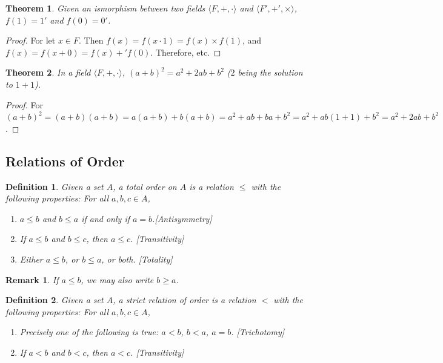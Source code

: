 \documentclass[oneside]{book}
\theoremstyle{mystyle}
\newtheorem{theorem}{Theorem}[section]
\newtheorem{definition}{Definition}[section]
\newtheorem{remark}{Remark}[section]
\begin{document}
\begin{theorem}
Given an ismorphism between two fields $\langle F,+,\cdot \rangle$ and $\langle F', +',\times \rangle$, $f(1) = 1'$ and $f(0) = 0'$.
\end{theorem}
\begin{proof}
For let $x\in F$. Then $f(x)=f(x\cdot 1) = f(x)\times f(1)$, and $f(x)=f(x+0) = f(x)+'f(0)$. Therefore, etc.
\end{proof}

\begin{theorem}
In a field $\langle F,+,\cdot \rangle$, $(a+ b)^2 = a^2 + 2ab + b^2$ ($2$ being the solution to $1+1$).
\end{theorem}
\begin{proof}
For $(a+b)^2 = (a+b)(a+b) = a(a+b)+b(a+b) = a^2 + ab + ba + b^2 = a^2 +ab(1+1)+b^2 = a^2 + 2ab + b^2$.
\end{proof}
%
\subsection{Relations of Order}
%
\begin{definition}
Given a set $A$, a total order on $A$ is a relation $\leq$ with the following properties: For all $a,b,c\in A$,
\begin{enumerate}
\item $a\leq b$ and $b\leq a$ if and only if $a=b$.\hfill [Antisymmetry]
\item If $a\leq b$ and $b\leq c$, then $a\leq c$. \hfill [Transitivity]
\item Either $a\leq b$, or $b\leq a$, or both. \hfill [Totality]
\end{enumerate}
\end{definition}

\begin{remark}
If $a\leq b$, we may also write $b\geq a$.
\end{remark}

\begin{definition}
Given a set $A$, a strict relation of order is a relation $<$ with the following properties: For all $a,b,c\in A$,
\begin{enumerate}
\item Precisely one of the following is true: $a<b$, $b<a$, $a=b$. \hfill [Trichotomy]
\item If $a<b$ and $b<c$, then $a<c$. \hfill [Transitivity]
\end{enumerate}
\end{definition}
\end{document}
